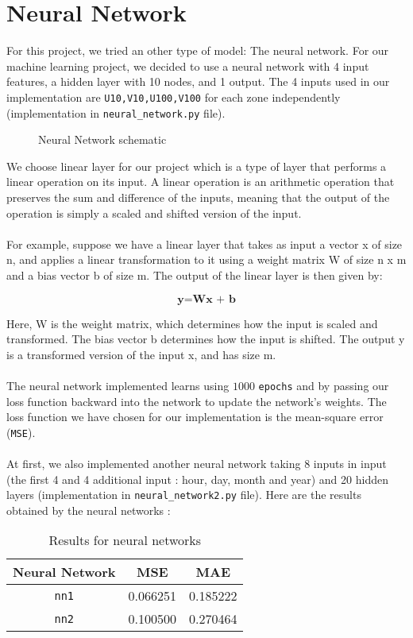 \section{Neural Network}
For this project, we tried an other type of model: The neural network. For our machine learning project, we decided to use a neural network with 4 input features, a hidden layer with 10 nodes, and 1 output. The 4 inputs used in our implementation are \verb|U10,V10,U100,V100| for each zone independently (implementation in \verb|neural_network.py| file).
\begin{figure}[H]
  \centering
  
  \caption{Neural Network schematic}
\end{figure}

We choose linear layer for our project which is a type of layer that performs a linear operation on its input. A linear operation is an arithmetic operation that preserves the sum and difference of the inputs, meaning that the output of the operation is simply a scaled and shifted version of the input.
\paragraph{}
For example, suppose we have a linear layer that takes as input a vector x of size n, and applies a linear transformation to it using a weight matrix W of size n x m and a bias vector b of size m. The output of the linear layer is then given by:

$$\textbf{y} = \textbf{Wx + b}$$

Here, W is the weight matrix, which determines how the input is scaled and transformed. The bias vector b determines how the input is shifted. The output y is a transformed version of the input x, and has size m.
\paragraph{}
The neural network implemented learns using $1000$ \verb|epochs| and by passing our loss function backward into the network to update the network's weights. The loss function we have chosen for our implementation is the mean-square error (\verb|MSE|).
\\\\
At first, we also implemented another neural network taking 8 inputs in input (the first 4 and 4 additional input : hour, day, month and year) and 20 hidden layers (implementation in \verb|neural_network2.py| file). Here are the results obtained by the neural networks :

\begin{table}[H]
\centering
\begin{tabular}{|c|c|c|}
\hline
Neural Network & MSE      & MAE      \\ \hline
\verb|nn1|            & 0.066251 & 0.185222 \\ \hline
\verb|nn2|            & 0.100500 & 0.270464 \\ \hline
\end{tabular}
\caption{Results for neural networks}
\label{tab:nn-results}
\end{table}
